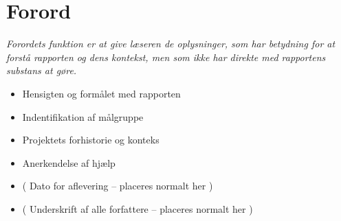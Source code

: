 \section*{Forord}
\textit{Forordets funktion er at give læseren de oplysninger, som har betydning for at forstå rapporten og dens kontekst, men som ikke har direkte med rapportens substans at gøre.}
\begin{itemize}
    \item Hensigten og formålet med rapporten 
    \item Indentifikation af målgruppe 
    \item Projektets forhistorie og konteks 
    \item Anerkendelse af hjælp
    \item ( Dato for aflevering -- placeres normalt her )
    \item ( Underskrift af alle forfattere -- placeres normalt her )
\end{itemize}